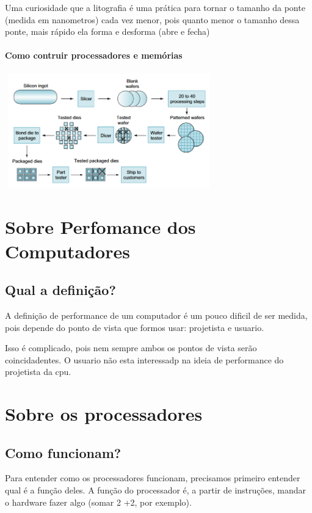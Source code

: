 \documentclass[12pt,a4paper]{report}
\begin{document}
	Uma curiosidade que a litografia é uma prática para tornar o tamanho da ponte (medida em nanometros) cada vez menor, pois quanto menor o tamanho dessa ponte, mais rápido ela forma e desforma (abre e fecha)
	
	\subsubsection{Como contruir processadores e memórias}
	
	\begin{center}
		
		\includegraphics[width=9cm,height=5cm,keepaspectratio=false]{imagens-teoria/construir_process.png}
		
	\end{center}
	
	\chapter{Sobre Perfomance dos Computadores}
	
	\section{Qual a definição?}
	A definição de performance de um computador é um pouco dificil de ser medida, pois depende do ponto de vista que formos usar: projetista e usuario.
	
	Isso é complicado, pois nem sempre ambos os pontos de vista serão coincidadentes. O usuario não esta interessadp na ideia de performance do projetista da cpu.
	
	\chapter{Sobre os processadores}
	
	\section{Como funcionam?}
	Para entender como os processadores funcionam, precisamos primeiro entender qual é a função deles. A função do processador é, a partir de instruções, mandar o hardware fazer algo (somar 2 +2, por exemplo).
	
\end{document}
